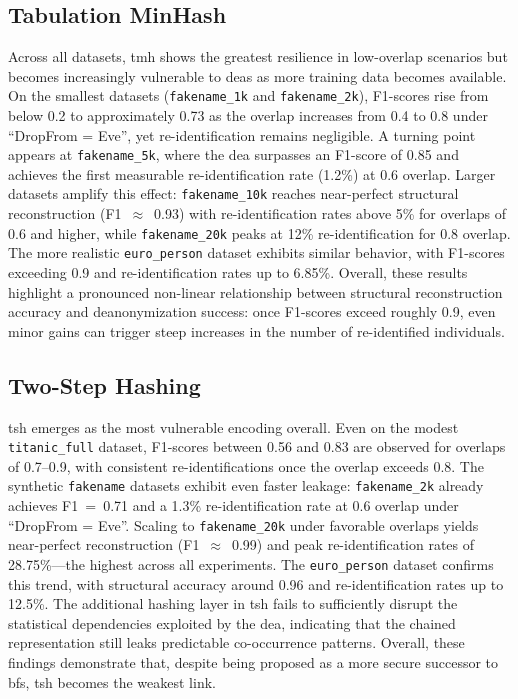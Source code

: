 \documentclass[a4paper,11pt]{scrartcl}
\begin{document}
\subsection{Tabulation MinHash}

Across all datasets, \ac{tmh} shows the greatest resilience in low-overlap scenarios but becomes increasingly vulnerable to \ac{dea}s as more training data becomes available. 
On the smallest datasets (\texttt{fakename\_1k} and \texttt{fakename\_2k}), F1-scores rise from below 0.2 to approximately 0.73 as the overlap increases from 0.4 to 0.8 under ``DropFrom = Eve'', yet re-identification remains negligible. 
A turning point appears at \texttt{fakename\_5k}, where the \ac{dea} surpasses an F1-score of 0.85 and achieves the first measurable re-identification rate (1.2\%) at 0.6 overlap. 
Larger datasets amplify this effect: \texttt{fakename\_10k} reaches near-perfect structural reconstruction (F1~$\approx$~0.93) with re-identification rates above 5\% for overlaps of 0.6 and higher, while \texttt{fakename\_20k} peaks at 12\% re-identification for 0.8 overlap. 
The more realistic \texttt{euro\_person} dataset exhibits similar behavior, with F1-scores exceeding 0.9 and re-identification rates up to 6.85\%. 
Overall, these results highlight a pronounced non-linear relationship between structural reconstruction accuracy and deanonymization success: once F1-scores exceed roughly 0.9, even minor gains can trigger steep increases in the number of re-identified individuals.

\subsection{Two-Step Hashing}
\ac{tsh} emerges as the most vulnerable encoding overall. 
Even on the modest \texttt{titanic\_full} dataset, F1-scores between 0.56 and 0.83 are observed for overlaps of 0.7–0.9, with consistent re-identifications once the overlap exceeds 0.8. 
The synthetic \texttt{fakename} datasets exhibit even faster leakage: \texttt{fakename\_2k} already achieves F1~=~0.71 and a 1.3\% re-identification rate at 0.6 overlap under ``DropFrom = Eve''. 
Scaling to \texttt{fakename\_20k} under favorable overlaps yields near-perfect reconstruction (F1~$\approx$~0.99) and peak re-identification rates of 28.75\%—the highest across all experiments. 
The \texttt{euro\_person} dataset confirms this trend, with structural accuracy around 0.96 and re-identification rates up to 12.5\%. 
The additional hashing layer in \ac{tsh} fails to sufficiently disrupt the statistical dependencies exploited by the \ac{dea}, indicating that the chained representation still leaks predictable co-occurrence patterns. 
Overall, these findings demonstrate that, despite being proposed as a more secure successor to \ac{bf}s, \ac{tsh} becomes the weakest link.
\end{document}
